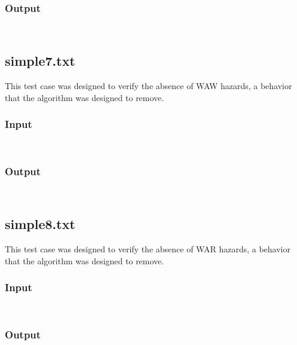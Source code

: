 \documentclass[12pt]{article}
\begin{document}
\subsubsection*{Output}
\begin{verbatim}
    
\end{verbatim}

\subsection{simple7.txt}
This test case was designed to verify the absence of WAW hazards, a behavior that the algorithm was designed to remove.

\subsubsection*{Input}
\begin{verbatim}
    
\end{verbatim}

\subsubsection*{Output}
\begin{verbatim}
    
\end{verbatim}

\subsection{simple8.txt}
This test case was designed to verify the absence of WAR hazards, a behavior that the algorithm was designed to remove.

\subsubsection*{Input}
\begin{verbatim}
    
\end{verbatim}

\subsubsection*{Output}
\begin{verbatim}
    
\end{verbatim}
\end{document}
